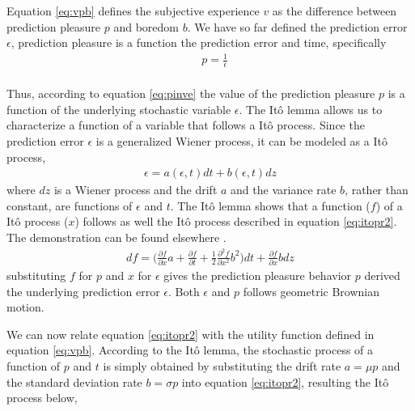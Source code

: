 \documentclass[11pt, onecolumn]{article}
\begin{document}
Equation \ref{eq:vpb} defines the subjective experience $v$ as the difference between prediction pleasure $p$ and boredom $b$. We have so far defined the prediction error $\epsilon$, prediction pleasure is a function the prediction error and time, specifically 
\begin{equation*}
\begin{split}
& p = \frac{1}{\epsilon} \\
\end{split}
\label{eq:pinve}
\end{equation*}

Thus, according to equation \ref{eq:pinve} the value of the prediction pleasure $p$ is a function of the underlying stochastic variable $\epsilon$. The It\^{o} lemma allows us to characterize a function of a variable that follows a It\^{o} process. Since the prediction error $\epsilon$ is a generalized Wiener process, it  can be modeled as a It\^{o} process, 
\begin{equation*}
\begin{split}
   \epsilon = a(\epsilon,t)dt + b(\epsilon,t)dz
\end{split}
\label{eq:itopr}
\end{equation*}
where $dz$ is a Wiener process and the drift $a$ and the variance rate $b$, rather than constant, are functions of $\epsilon$ and $t$. The It\^{o} lemma shows that a function ($f$) of a It\^{o} process ($x$) follows as well the It\^{o} process described in equation \ref{eq:itopr2}. The demonstration can be found elsewhere \citep{shreve_stochastic_2010}. 
\begin{equation}
\begin{split}
   df = \bigg(\frac{\partial f}{\partial x} a  + \frac{\partial f}{\partial t} + \frac{1}{2}\frac{\partial ^2 f}{\partial x^2} b^2 \bigg)dt + \frac{\partial f}{\partial x}b dz
\end{split}
\label{eq:itopr2}
\end{equation}
substituting $f$ for $p$ and $x$ for $\epsilon$ gives the prediction pleasure behavior $p$ derived the underlying prediction error $\epsilon$. Both  $\epsilon$ and $p$ follows geometric Brownian motion.






We can now relate equation \ref{eq:itopr2} with the utility function defined in equation \ref{eq:vpb}. According to the It\^{o} lemma, the stochastic process of a function of $p$ and $t$ is simply obtained by substituting the drift rate $a = \mu p$ and the standard deviation rate $b = \sigma p$ into equation \ref{eq:itopr2}, resulting the It\^{o} process below,
\end{document}
